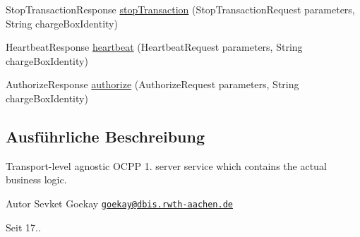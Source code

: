 \begin{DoxyCompactItemize}
\item 
Stop\+Transaction\+Response \hyperlink{classde_1_1rwth_1_1idsg_1_1steve_1_1service_1_1_central_system_service12___service_ab0f9573b5b8cf848db098e2c54e10dd9}{stop\+Transaction} (Stop\+Transaction\+Request parameters, String charge\+Box\+Identity)
\item 
Heartbeat\+Response \hyperlink{classde_1_1rwth_1_1idsg_1_1steve_1_1service_1_1_central_system_service12___service_a53dea29e3048cc71a29b71728fdb7d0e}{heartbeat} (Heartbeat\+Request parameters, String charge\+Box\+Identity)
\item 
Authorize\+Response \hyperlink{classde_1_1rwth_1_1idsg_1_1steve_1_1service_1_1_central_system_service12___service_aa37ed4b7180b56067a61bb5c30bdbc6a}{authorize} (Authorize\+Request parameters, String charge\+Box\+Identity)
\end{DoxyCompactItemize}


\subsection{Ausführliche Beschreibung}
Transport-\/level agnostic O\+C\+P\+P 1. server service which contains the actual business logic.

\begin{DoxyAuthor}{Autor}
Sevket Goekay \href{mailto:goekay@dbis.rwth-aachen.de}{\tt goekay@dbis.\+rwth-\/aachen.\+de} 
\end{DoxyAuthor}
\begin{DoxySince}{Seit}
17.. 
\end{DoxySince}


